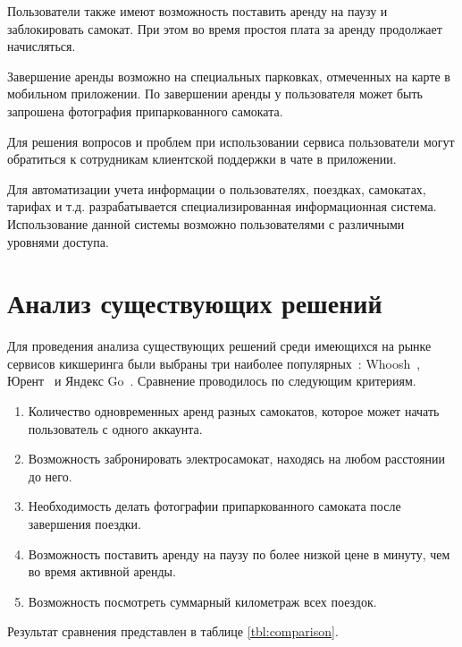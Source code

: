 Пользователи также имеют возможность поставить аренду на паузу и заблокировать самокат. При этом во время простоя плата за аренду продолжает начисляться.

Завершение аренды возможно на специальных парковках, отмеченных на карте в мобильном приложении. По завершении аренды у пользователя может быть запрошена фотография припаркованного самоката.

Для решения вопросов и проблем при использовании сервиса пользователи могут обратиться к сотрудникам клиентской поддержки в чате в приложении.

Для автоматизации учета информации о пользователях, поездках, самокатах, тарифах и т.д. разрабатывается специализированная информационная система. Использование данной системы возможно пользователями с различными уровнями доступа.

\section{Анализ существующих решений}

Для проведения анализа существующих решений среди имеющихся на рынке сервисов кикшеринга были выбраны три наиболее популярных~\cite{hype}: Whoosh~\cite{whoosh}, Юрент~\cite{urent} и Яндекс Go~\cite{yago}. Сравнение проводилось по следующим критериям.

\begin{enumerate}
    \item Количество одновременных аренд разных самокатов, которое может начать пользователь с одного аккаунта.
    \item Возможность забронировать электросамокат, находясь на любом расстоянии до него.
    \item Необходимость делать фотографии припаркованного самоката после завершения поездки.
    \item Возможность поставить аренду на паузу по более низкой цене в минуту, чем во время активной аренды.
    \item Возможность посмотреть суммарный километраж всех поездок.
\end{enumerate}

Результат сравнения представлен в таблице \ref{tbl:comparison}.

